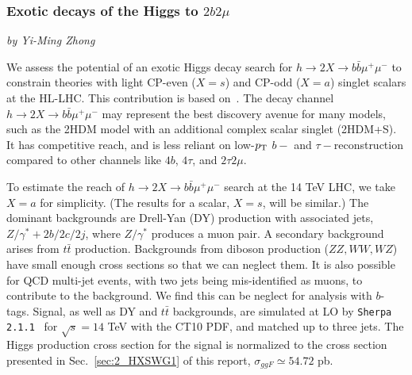 \subsubsection{Exotic  decays of the Higgs to $2b2\mu$}
\begin{center}
 {\it{ by Yi-Ming Zhong}}
\end{center}
We assess the potential of an exotic Higgs decay search for $h \to 2X \to b\bar{b}\mu^+ \mu^-$ to constrain theories with light CP-even ($X = s$) and CP-odd ($X = a$) singlet scalars at the HL-LHC. This contribution is based on~\cite{Curtin:2014pda}. The decay channel $h \to 2X \to b\bar{b}\mu^+ \mu^-$ may represent the best discovery avenue for many models, such as the 2HDM model with an additional complex scalar singlet (2HDM+S). It has competitive reach, and is less reliant on low-$p_{\rm T}$ $b-$ and $\tau-$reconstruction compared to other channels like $4b$, $4\tau$, and $2\tau2\mu$. 


To estimate the reach of $h \to 2X \to b\bar{b}\mu^+ \mu^-$ search at the 14 TeV LHC, we take $X =a$ for simplicity. (The results for a scalar, $X=s$, will be similar.) The dominant backgrounds are Drell-Yan (DY) production with associated jets, \ie $Z/\gamma^*+2b/2c/2j$, where $Z/\gamma^*$ produces a muon pair. A secondary background arises from $t\bar t$ production. Backgrounds from diboson production ($ZZ, WW, WZ$) have small enough cross sections so that we can neglect them. It is also possible for QCD multi-jet events, with two jets being mis-identified as muons, to contribute to the background. We find this can be neglect for analysis with $b$-tags. Signal, as well as DY and $t\bar t$ backgrounds, are simulated at LO by \texttt{Sherpa 2.1.1}~\cite{Gleisberg:2008ta} for $\sqrt{s}=14$ TeV with the CT10 PDF, and matched up to three jets. The Higgs production cross section for the signal is normalized to the cross section presented in Sec.~\ref{sec:2_HXSWG1} of this report, $\sigma_{ggF} \simeq 54.72$ pb.  



